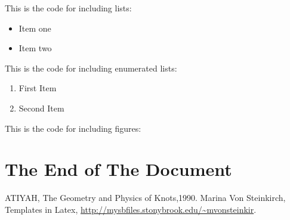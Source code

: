 \documentclass[10pt]{article} %
\begin{document}
This is the code for including lists:
\begin{itemize}
\item Item one
\item Item two
\end{itemize}

This is the code for including enumerated lists:
\begin{enumerate}
\item First Item
\item Second Item
\end{enumerate}

This is the code for including figures:
\begin{figure}[htbp]
\begin{center}
\label{myfigure}
\end{center}
\end{figure}

\section{The End of The Document}


\begin{thebibliography}{2} %
 ATIYAH,  The Geometry and Physics of Knots,1990.
 Marina Von Steinkirch,  Templates in Latex, \url{http://mysbfiles.stonybrook.edu/~mvonsteinkir}.
\end{thebibliography}

\printindex %
\end{document}
